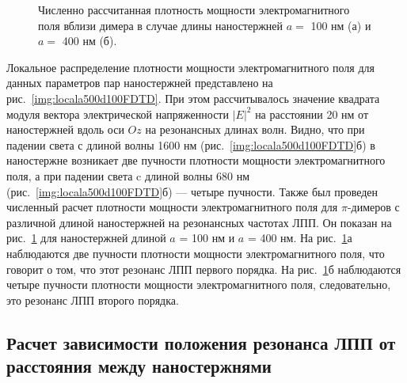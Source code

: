 \begin{figure}
\caption{Численно рассчитанная плотность мощности электромагнитного поля вблизи димера в случае длины наностержней $ a = $ 100 нм (а) и $ a = $ 400 нм (б).}
\label{img:localfield2}
\end{figure}

Локальное распределение плотности мощности электромагнитного поля для данных параметров пар наностержней представлено на рис.~\ref{img:locala500d100FDTD}. При этом рассчитывалось значение квадрата модуля вектора электрической напряженности $ \lvert E \rvert ^2 $ на расстоянии 20 нм от наностержней вдоль оси $ Oz $ на резонансных длинах волн. Видно, что при падении света с длиной волны 1600 нм (рис.~\ref{img:locala500d100FDTD}б) в наностержне возникает две пучности плотности мощности электромагнитного поля, а при падении света c длиной волны 680 нм (рис.~\ref{img:locala500d100FDTD}б) --- четыре пучности. Также был проведен численный расчет плотности мощности электромагнитного поля для $ \pi $-димеров с различной длиной наностержней на резонансных частотах ЛПП. Он показан на рис.~\ref{img:localfield2} для наностержней длиной $ a $ = 100 нм и $ a $ = 400 нм. На рис.~\ref{img:localfield2}а наблюдаются две пучности плотности мощности электромагнитного поля, что говорит о том, что этот резонанс ЛПП первого порядка. На рис.~\ref{img:localfield2}б наблюдаются четыре пучности плотности мощности электромагнитного поля, следовательно, это резонанс ЛПП второго порядка.


\subsection{Расчет зависимости положения резонанса ЛПП от расстояния между наностержнями}

